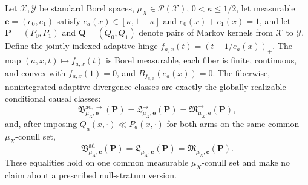 Let \(\mathcal X,\mathcal Y\) be standard Borel spaces, \(\mu_X\in\mathcal P(\mathcal X)\), \(0<\kappa\le1/2\), let measurable \(\boldsymbol e=(e_0,e_1)\) satisfy \(e_a(x)\in[\kappa,1-\kappa]\) and \(e_0(x)+e_1(x)=1\), and let \(\boldsymbol P=(P_0,P_1)\) and \(\boldsymbol Q=(Q_0,Q_1)\) denote pairs of Markov kernels from \(\mathcal X\) to \(\mathcal Y\).  Define the jointly indexed adaptive hinge \(f_{a,x}(t)=(t-1/e_a(x))_+\).  The map \((a,x,t)\mapsto f_{a,x}(t)\) is Borel measurable, each fiber is finite, continuous, and convex with \(f_{a,x}(1)=0\), and \(B_{f_{a,x}}(e_a(x))=0\).  The fiberwise, nonintegrated adaptive divergence classes are exactly the globally realizable conditional causal classes:
\[
 \mathfrak B^{\mathrm{ad},\to}_{\mu_X,\boldsymbol e}(\boldsymbol P)
 =\mathfrak L^{\to}_{\mu_X,\boldsymbol e}(\boldsymbol P)
 =\mathfrak M^{\to}_{\mu_X,\boldsymbol e}(\boldsymbol P),
\]
and, after imposing \(Q_a(x,\cdot)\ll P_a(x,\cdot)\) for both arms on the same common \(\mu_X\)-conull set,
\[
 \mathfrak B^{\mathrm{ad}}_{\mu_X,\boldsymbol e}(\boldsymbol P)
 =\mathfrak L_{\mu_X,\boldsymbol e}(\boldsymbol P)
 =\mathfrak M_{\mu_X,\boldsymbol e}(\boldsymbol P).
\]
These equalities hold on one common measurable \(\mu_X\)-conull set and make no claim about a prescribed null-stratum version.